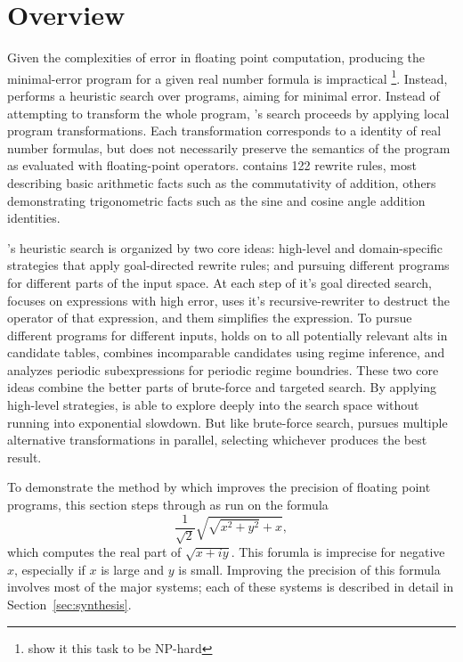 \documentclass[paper.tex]{subfiles}
\begin{document}
\section{Overview}
\label{sec:overview}

Given the complexities of error in floating point computation,
  producing the minimal-error program
  for a given real number formula
  is impractical
  \footnote{\cite{} show it this task to be NP-hard}.
Instead, \casio performs a heuristic search over programs,
  aiming for minimal error.
Instead of attempting to transform the whole program,
  \casio's search proceeds by applying local program transformations.
Each transformation corresponds to a identity of real number formulas,
  but does not necessarily preserve the semantics of the program
  as evaluated with floating-point operators.
\casio contains 122 rewrite rules,
  most describing basic arithmetic facts
  such as the commutativity of addition,
  others demonstrating trigonometric facts
  such as the sine and cosine angle addition identities.

\casio's heuristic search is organized by two core ideas:
  high-level and domain-specific strategies
  that apply goal-directed rewrite rules;
  and pursuing different programs
  for different parts of the input space.
At each step of it's goal directed search,
  \casio focuses on expressions with high error,
  uses it's recursive-rewriter to destruct the operator of that expression,
  and them simplifies the expression.
To pursue different programs for different inputs,
  \casio holds on to all potentially relevant alts in candidate tables,
  combines incomparable candidates using regime inference,
  and analyzes periodic subexpressions for periodic regime boundries.
These two core ideas combine the better parts
  of brute-force and targeted search.
By applying high-level strategies,
  \casio is able to explore deeply into the search space
  without running into exponential slowdown.
But like brute-force search,
  \casio pursues multiple alternative transformations in parallel, 
  selecting whichever produces the best result.

To demonstrate the method by which
  \casio improves the precision of floating point programs,
  this section steps through \casio as run on the formula
\begin{equation}\label{eq:ex}
  \frac1{\sqrt2} \sqrt{\sqrt{x^2 + y^2} + x},
\end{equation}
  which computes the real part of $\sqrt{x + i y}$.
This forumla is imprecise for negative $x$,
  especially if $x$ is large and $y$ is small.
Improving the precision of this formula
  involves most of the major systems;
  each of these systems is described in detail
  in Section~\ref{sec:synthesis}.
\end{document}
